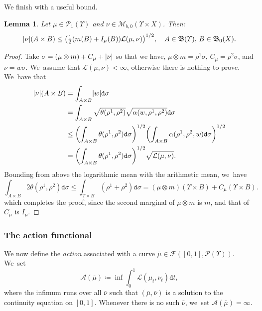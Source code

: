 \documentclass[10pt]{amsart}
\newtheorem{lemma}[theorem]{Lemma}
\theoremstyle{definition}
\theoremstyle{remark}
\DeclarePairedDelimiter{\paren}{\lparen}{\rparen}
\DeclarePairedDelimiter{\abs}{\lvert}{\rvert}
\begin{document}
We finish with a useful bound.
\begin{lemma}\label{t:bound-nu-lagrangian}
Let $\mu \in \mathscr{P}_{1}(\varUpsilon)$ and $\nu \in \mathscr{M}_{b,0}(\varUpsilon \times X)$.
Then:
\begin{equation*}
\abs{\nu}(A \times B) \leq \paren*{ \tfrac{1}{2} \paren*{m(B) + I_{\mu}(B)} \mathcal{L}(\mu, \nu) }^{1/2}, \quad A \in \mathfrak{B}(\varUpsilon),\, B \in \mathfrak{B}_{0}(X).
\end{equation*}
\end{lemma}

\begin{proof}
Take $\sigma = (\mu \otimes m) + C_{\mu} + \abs{\nu}$ so that we have, $\mu \otimes m = \rho^{1} \sigma$, $C_{\mu} = \rho^{2} \sigma$, and $\nu = w \sigma$. We~assume that $\mathcal{L}(\mu, \nu)<\infty$, otherwise there is nothing to prove. We~have that
\begin{align*}
|\nu|(A \times B)
&= \int_{A \times B} \abs{w} \mathtt{d} \sigma
\\
&= \int_{A \times B} \sqrt{\theta(\rho^1, \rho^2)} \sqrt{\alpha(w, \rho^1, \rho^2)} \mathtt{d} \sigma
\\
&\le \paren*{ \int_{A \times B} \theta(\rho^1, \rho^2) \mathtt{d} \sigma }^{1/2} \paren*{ \int_{A \times B} \alpha(\rho^1, \rho^2,w) \mathtt{d} \sigma }^{1/2}
\\
&= \paren*{ \int_{A \times B} \theta(\rho^1, \rho^2) \mathtt{d} \sigma }^{1/2} \sqrt{\mathcal{L}(\mu, \nu)}.
\end{align*}
Bounding from above the logarithmic mean with the arithmetic mean, we~have
\begin{equation*}
\int_{A \times B} 2\theta(\rho^1, \rho^2) \mathtt{d} \sigma
\le \int_{\varUpsilon \times B} (\rho^1+\rho^2) \mathtt{d} \sigma
= (\mu \otimes m)(\varUpsilon \times B) + C_{\mu}(\varUpsilon \times B).
\end{equation*}
which completes the proof, since the second marginal of $\mu \otimes m$ is $m$, and that of $C_{\mu}$ is $I_{\mu}$.
\end{proof}

\subsubsection{The action functional}
We now define the \emph{action} associated with a curve $\bar{\mu} \in \mathscr{F}([0,1], \mathscr{P}(\varUpsilon))$. We~set
\begin{equation*}
\mathcal{A}(\bar{\mu}) \coloneq \inf \int_{0}^{1} \mathcal{L}(\mu_{t}, \nu_{t}) \mathtt{d} t,
\end{equation*}
where the infimum runs over all $\bar{\nu}$ such that $(\bar{\mu}, \bar{\nu})$ is a solution to the continuity equation on $[0,1]$.
Whenever there is no such $\bar{\nu}$, we~set $\mathcal{A}(\bar{\mu}) = \infty$.
\end{document}
